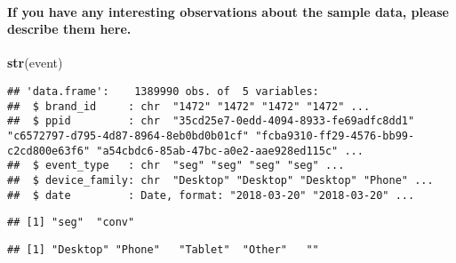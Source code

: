 \documentclass[]{article}
\newenvironment{Shaded}{\begin{snugshade}}{\end{snugshade}}
\newcommand{\KeywordTok}[1]{\textcolor[rgb]{0.13,0.29,0.53}{\textbf{#1}}}
\newcommand{\CommentTok}[1]{\textcolor[rgb]{0.56,0.35,0.01}{\textit{#1}}}
\newcommand{\OperatorTok}[1]{\textcolor[rgb]{0.81,0.36,0.00}{\textbf{#1}}}
\newcommand{\NormalTok}[1]{#1}
\let\oldparagraph\paragraph
\renewcommand{\paragraph}[1]{\oldparagraph{#1}\mbox{}}
\begin{document}
\paragraph{If you have any interesting observations about the sample
data, please describe them
here.}\label{if-you-have-any-interesting-observations-about-the-sample-data-please-describe-them-here.}

\begin{Shaded}
\begin{Highlighting}[]
\KeywordTok{str}\NormalTok{(event)}
\end{Highlighting}
\end{Shaded}

\begin{verbatim}
## 'data.frame':    1389990 obs. of  5 variables:
##  $ brand_id     : chr  "1472" "1472" "1472" "1472" ...
##  $ ppid         : chr  "35cd25e7-0edd-4094-8933-fe69adfc8dd1" "c6572797-d795-4d87-8964-8eb0bd0b01cf" "fcba9310-ff29-4576-bb99-c2cd800e63f6" "a54cbdc6-85ab-47bc-a0e2-aae928ed115c" ...
##  $ event_type   : chr  "seg" "seg" "seg" "seg" ...
##  $ device_family: chr  "Desktop" "Desktop" "Desktop" "Phone" ...
##  $ date         : Date, format: "2018-03-20" "2018-03-20" ...
\end{verbatim}

\begin{Shaded}
\end{Shaded}

\begin{verbatim}
## [1] "seg"  "conv"
\end{verbatim}

\begin{Shaded}
\end{Shaded}

\begin{verbatim}
## [1] "Desktop" "Phone"   "Tablet"  "Other"   ""
\end{verbatim}

\begin{Shaded}
\end{Shaded}
\end{document}
